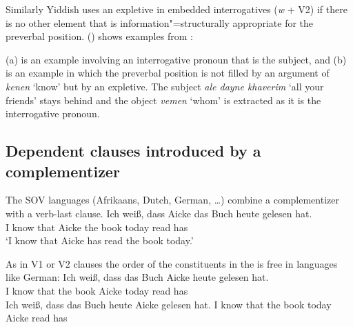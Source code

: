 Similarly Yiddish uses an expletive in embedded interrogatives (\emph{w} + V2) if 
there is no other element that is information"=structurally appropriate for the preverbal position.
() shows examples from \citet[--404]{Prince89a}:

\eal
\label{ex-Yiddish-interrogatives-expletive}
\zl
(a) is an example involving an interrogative pronoun that is the subject, and (b) is an
example in which the preverbal position is not filled by an argument of \emph{kenen} `know' but by
an expletive. The subject \emph{ale dayne khaverim} `all your friends' stays behind and the object
\emph{vemen} `whom' is extracted as it is the interrogative pronoun.


\subsection{Dependent clauses introduced by a complementizer}


The SOV languages (Afrikaans, Dutch, German, \ldots) combine a complementizer with a verb-last clause.
\ea
\gll Ich weiß, dass Aicke das Buch heute gelesen hat.\\
     I   know  that Aicke the book today read    has\\
\glt `I know that Aicke has read the book today.'
\z

As in V1 or V2 clauses the order of the constituents in the \mf is free in languages like German:
\eal
\ex 
\gll Ich weiß, dass das Buch Aicke heute gelesen hat.\\
     I   know  that the book Aicke today read has\\
\ex 
\gll Ich weiß, dass das Buch heute Aicke gelesen hat.
     I   know  that the book today Aicke read has\\
\zl


